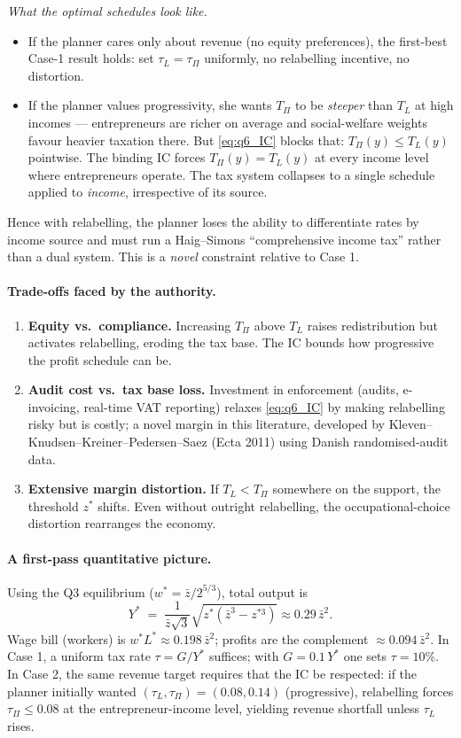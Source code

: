 \documentclass[11pt,a4paper]{article}
\begin{document}
\smallskip
\emph{What the optimal schedules look like.}
\begin{itemize}[leftmargin=*,itemsep=2pt]
    \item If the planner cares only about revenue (no equity preferences), the first-best Case-1 result holds: set $\tau_{L}=\tau_{\Pi}$ uniformly, no relabelling incentive, no distortion.
    \item If the planner values progressivity, she wants $T_{\Pi}$ to be \emph{steeper} than $T_{L}$ at high incomes --- entrepreneurs are richer on average and social-welfare weights favour heavier taxation there. But \eqref{eq:q6_IC} blocks that: $T_{\Pi}(y)\le T_{L}(y)$ pointwise. The binding IC forces $T_{\Pi}(y)=T_{L}(y)$ at every income level where entrepreneurs operate. The tax system collapses to a single schedule applied to \emph{income}, irrespective of its source.
\end{itemize}
Hence with relabelling, the planner loses the ability to differentiate rates by income source and must run a Haig--Simons ``comprehensive income tax'' rather than a dual system. This is a \emph{novel} constraint relative to Case 1.

\paragraph{Trade-offs faced by the authority.}
\begin{enumerate}[leftmargin=*,itemsep=2pt]
    \item \textbf{Equity vs.\ compliance.} Increasing $T_{\Pi}$ above $T_{L}$ raises redistribution but activates relabelling, eroding the tax base. The IC bounds how progressive the profit schedule can be.
    \item \textbf{Audit cost vs.\ tax base loss.} Investment in enforcement (audits, e-invoicing, real-time VAT reporting) relaxes \eqref{eq:q6_IC} by making relabelling risky but is costly; a novel margin in this literature, developed by Kleven--Knudsen--Kreiner--Pedersen--Saez (Ecta 2011) using Danish randomised-audit data.
    \item \textbf{Extensive margin distortion.} If $T_{L}<T_{\Pi}$ somewhere on the support, the threshold $z^{*}$ shifts. Even without outright relabelling, the occupational-choice distortion rearranges the economy.
\end{enumerate}

\paragraph{A first-pass quantitative picture.}
Using the Q3 equilibrium ($w^{*}=\bar z/2^{5/3}$), total output is
\[
Y^{*}\;=\;\frac{1}{\bar z\sqrt{3}}\sqrt{z^{*}(\bar z^{3}-z^{*3})}\approx 0.29\,\bar z^{2}.
\]
Wage bill (workers) is $w^{*}L^{*}\approx 0.198\,\bar z^{2}$; profits are the complement $\approx 0.094\,\bar z^{2}$. In Case 1, a uniform tax rate $\tau=G/Y^{*}$ suffices; with $G=0.1\,Y^{*}$ one sets $\tau=10\%$. In Case 2, the same revenue target requires that the IC be respected: if the planner initially wanted $(\tau_{L},\tau_{\Pi})=(0.08,0.14)$ (progressive), relabelling forces $\tau_{\Pi}\le 0.08$ at the entrepreneur-income level, yielding revenue shortfall unless $\tau_{L}$ rises.
\end{document}
